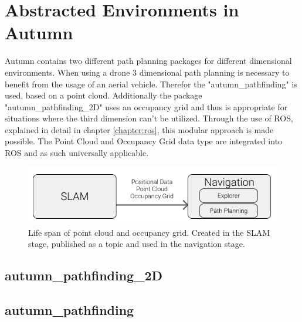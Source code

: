 \section{Abstracted Environments in Autumn}
Autumn contains two different path planning packages for different dimensional environments. When using a drone 3 dimensional path planning is necessary to benefit from the usage of an aerial vehicle. Therefor the "autumn\_pathfinding" is used, based on a point cloud. Additionally the package "autumn\_pathfinding\_2D" uses an occupancy grid and thus is appropriate for situations where the third dimension can't be utilized.\newline
Through the use of ROS, explained in detail in chapter \ref{chapter:ros}, this modular approach is made possible. The Point Cloud and Occupancy Grid data type are integrated into ROS and as such universally applicable.   

\begin{figure}[h]
	\centering
	\includegraphics[width=0.8\linewidth]{img/EnvironmentTransfer}
	\caption{Life span of point cloud and occupancy grid. Created in the SLAM stage, published as a topic and used in the navigation stage.}
	\label{fig:abstract_environments_enviromentTransfer}
\end{figure}

\subsection{autumn\_pathfinding\_2D}

\subsection{autumn\_pathfinding}